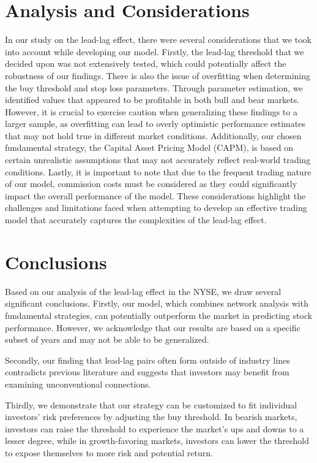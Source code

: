 \documentclass{article}
\begin{document}
\section{Analysis and Considerations}
In our study on the lead-lag effect, there were several considerations that we took into account
 while developing our model. Firstly, the lead-lag threshold that we decided upon was not extensively tested, 
  which could potentially affect the robustness of our findings. 
  There is also the issue of overfitting when determining the buy threshold and stop loss parameters. Through parameter estimation, we identified values that appeared to be profitable in both bull and bear markets. However, it is crucial to exercise caution when generalizing these findings to a larger sample, as overfitting can lead to overly optimistic performance estimates that may not hold true in different market conditions. 
  Additionally, our chosen fundamental strategy, the Capital Asset Pricing Model (CAPM),
  is based on certain unrealistic assumptions that may not accurately reflect real-world trading conditions. Lastly, it is important to note that due to the frequent trading nature of our model, 
  commission costs must be considered as they could significantly impact the overall performance of the model. These considerations highlight the challenges and limitations
   faced when attempting to develop an effective trading model that accurately captures the complexities of the lead-lag effect.

\section{Conclusions}
Based on our analysis of the lead-lag effect in the NYSE, we draw several significant conclusions. Firstly, our model, which combines network analysis with fundamental strategies, can potentially outperform the market in predicting stock performance. However, we acknowledge that our results are based on a specific subset of years and may not be able to be generalized. 

Secondly, our finding that lead-lag pairs often form outside of industry lines contradicts previous literature and suggests that investors may benefit from examining unconventional connections. 

Thirdly, we demonstrate that our strategy can be customized to fit individual investors' risk preferences by adjusting the buy threshold. In bearish markets, investors can raise the threshold to experience the market's ups and downs to a lesser degree, while in growth-favoring markets, investors can lower the threshold to expose themselves to more risk and potential return. 
\end{document}
